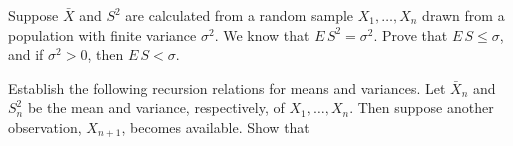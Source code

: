 \documentclass[12pt,letterpaper]{exam}
\begin{document}
\begin{questions}
	\begin{solution}
		
	\end{solution}
	
	\setcounter{question}{10}
	\question 
	Suppose \(\bar{X}\) and \(S^2\) are calculated from a random sample \(X_1,\ldots, X_n\) 
	drawn from a population with finite variance \(\sigma^2\). We know that \(E\,S^2 = \sigma^2\). 
	Prove that \(E\,S \leq \sigma\), and
	if \(\sigma^2 > 0\), then \(E\,S < \sigma\).
	
	\begin{solution}
		
	\end{solution}
	
	\setcounter{question}{14}
	\question 
	Establish the following recursion relations for means and variances. 
	Let \(\bar{X}_n\) and \(S_n^2\) be the mean and variance, respectively, of \(X_1,\ldots,X_n\). 
	Then suppose another observation, \(X_{n+1}\), becomes available. Show that
	
	
	\begin{solution}
\end{solution}
\end{questions}
\end{document}
